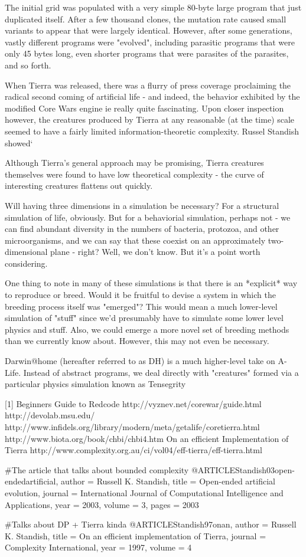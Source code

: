 The initial grid was populated with a very simple 80-byte large program that just duplicated itself. After a few thousand clones, the mutation rate caused small variants to appear that were largely identical. However, after some generations, vastly different programs were "evolved", including parasitic programs that were only 45 bytes long, even shorter programs that were parasites of the parasites, and so forth. 

When Tierra was released, there was a flurry of press coverage proclaiming the radical second coming of artificial life - and indeed, the behavior exhibited by the modified Core Wars engine ie really quite fascinating. Upon closer inspection however, the creatures produced by Tierra at any reasonable (at the time) scale seemed to have a fairly limited information-theoretic complexity. Russel Standish showed` 

Although Tierra's general approach may be promising, Tierra creatures themselves were found to have low theoretical complexity - the curve of interesting creatures flattens out quickly.

Will having three dimensions in a simulation be necessary? For a structural simulation of life, obviously. But for a behaviorial simulation, perhaps not - we can find abundant diversity in the numbers of bacteria, protozoa, and other microorganisms, and we can say that these coexist on an approximately two-dimensional plane - right? Well, we don't know. But it's a point worth considering.

One thing to note in many of these simulations is that there is an *explicit* way to reproduce or breed. Would it be fruitful to devise a system in which the breeding process itself was "emerged"? This would mean a much lower-level simulation of "stuff" since we'd presumably have to simulate some lower level physics and stuff. Also, we could emerge a more novel set of breeding methods than we currently know about. However, this may not even be necessary.

Darwin@home (hereafter referred to as DH) is a much higher-level take on A-Life. Instead of abstract programs, we deal directly with "creatures" formed via a particular physics simulation known as Tensegrity





[1] Beginners Guide to Redcode http://vyznev.net/corewar/guide.html
http://devolab.msu.edu/
http://www.infidels.org/library/modern/meta/getalife/coretierra.html
http://www.biota.org/book/chbi/chbi4.htm
On an efficient Implementation of Tierra http://www.complexity.org.au/ci/vol04/eff-tierra/eff-tierra.html

#The article that talks about bounded complexity
@ARTICLE{Standish03open-endedartificial,
    author = {Russell K. Standish},
    title = {Open-ended artificial evolution},
    journal = {International Journal of Computational Intelligence and Applications},
    year = {2003},
    volume = {3},
    pages = {2003}
}

#Talks about DP + Tierra kinda
@ARTICLE{Standish97onan,
    author = {Russell K. Standish},
    title = {On an efficient implementation of Tierra},
    journal = {Complexity International},
    year = {1997},
    volume = {4}
}